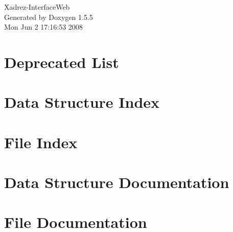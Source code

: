 \documentclass[a4paper]{book}
\begin{document}
\begin{titlepage}
\vspace*{7cm}
\begin{center}
{\Large Xadrez-InterfaceWeb }\\
\vspace*{1cm}
{\large Generated by Doxygen 1.5.5}\\
\vspace*{0.5cm}
{\small Mon Jun 2 17:16:53 2008}\\
\end{center}
\end{titlepage}
\clearemptydoublepage
{}
\tableofcontents
\clearemptydoublepage
{}
\chapter{Deprecated List}

\chapter{Data Structure Index}

\chapter{File Index}

\chapter{Data Structure Documentation}

\chapter{File Documentation}











































\printindex
\end{document}
